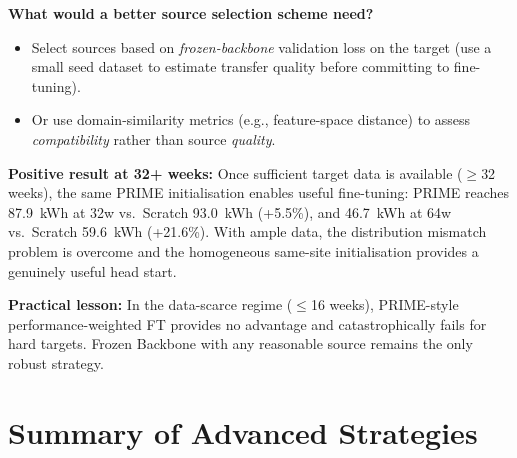 \documentclass[12pt,a4paper]{report}
\begin{document}
\textbf{What would a better source selection scheme need?}
\begin{itemize}
    \item Select sources based on \textit{frozen-backbone} validation loss on the target (use a small seed dataset to estimate transfer quality before committing to fine-tuning).
    \item Or use domain-similarity metrics (e.g., feature-space distance) to assess \textit{compatibility} rather than source \textit{quality}.
\end{itemize}

\textbf{Positive result at 32+ weeks:} Once sufficient target data is available ($\geq$32 weeks), the same PRIME initialisation enables useful fine-tuning: PRIME reaches 87.9~kWh at 32w vs.\ Scratch 93.0~kWh (+5.5\%), and 46.7~kWh at 64w vs.\ Scratch 59.6~kWh (+21.6\%). With ample data, the distribution mismatch problem is overcome and the homogeneous same-site initialisation provides a genuinely useful head start.

\textbf{Practical lesson:} In the data-scarce regime ($\leq$16 weeks), PRIME-style performance-weighted FT provides no advantage and catastrophically fails for hard targets. Frozen Backbone with any reasonable source remains the only robust strategy.

\section{Summary of Advanced Strategies}
\end{document}
